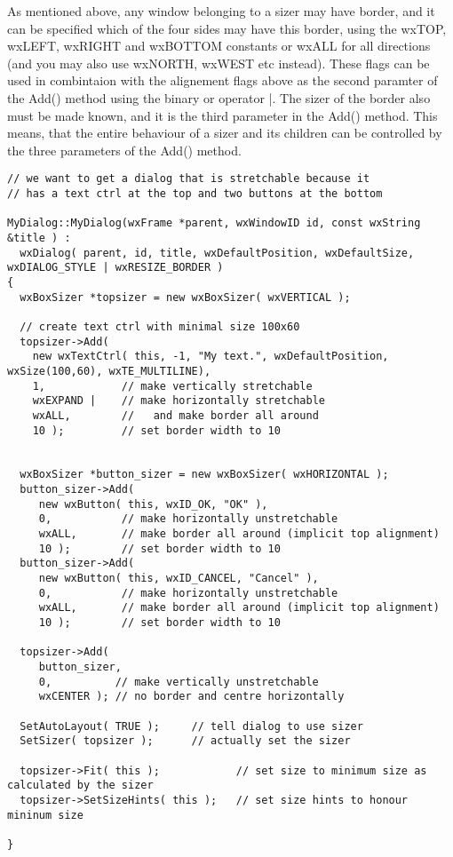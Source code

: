 As mentioned above, any window belonging to a sizer may have border, and it can be specified
which of the four sides may have this border, using the wxTOP, wxLEFT, wxRIGHT and wxBOTTOM
constants or wxALL for all directions (and you may also use wxNORTH, wxWEST etc instead). These
flags can be used in combintaion with the alignement flags above as the second paramter of the
Add() method using the binary or operator |. The sizer of the border also must be made known,
and it is the third parameter in the Add() method. This means, that the entire behaviour of
a sizer and its children can be controlled by the three parameters of the Add() method.

\begin{verbatim}
// we want to get a dialog that is stretchable because it
// has a text ctrl at the top and two buttons at the bottom

MyDialog::MyDialog(wxFrame *parent, wxWindowID id, const wxString &title ) :
  wxDialog( parent, id, title, wxDefaultPosition, wxDefaultSize, wxDIALOG_STYLE | wxRESIZE_BORDER )
{
  wxBoxSizer *topsizer = new wxBoxSizer( wxVERTICAL );
  
  // create text ctrl with minimal size 100x60
  topsizer->Add( 
    new wxTextCtrl( this, -1, "My text.", wxDefaultPosition, wxSize(100,60), wxTE_MULTILINE),
    1,            // make vertically stretchable
    wxEXPAND |    // make horizontally stretchable
    wxALL,        //   and make border all around
    10 );         // set border width to 10


  wxBoxSizer *button_sizer = new wxBoxSizer( wxHORIZONTAL );
  button_sizer->Add(
     new wxButton( this, wxID_OK, "OK" ), 
     0,           // make horizontally unstretchable
     wxALL,       // make border all around (implicit top alignment)
     10 );        // set border width to 10
  button_sizer->Add(
     new wxButton( this, wxID_CANCEL, "Cancel" ), 
     0,           // make horizontally unstretchable
     wxALL,       // make border all around (implicit top alignment)
     10 );        // set border width to 10
  
  topsizer->Add( 
     button_sizer,
     0,          // make vertically unstretchable
     wxCENTER ); // no border and centre horizontally

  SetAutoLayout( TRUE );     // tell dialog to use sizer
  SetSizer( topsizer );      // actually set the sizer

  topsizer->Fit( this );            // set size to minimum size as calculated by the sizer
  topsizer->SetSizeHints( this );   // set size hints to honour mininum size
  
}
\end{verbatim}


